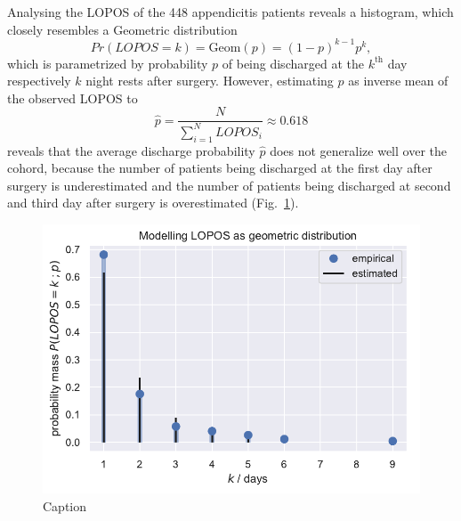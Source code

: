 Analysing the LOPOS of the 448 appendicitis patients reveals a histogram, which closely resembles a Geometric distribution
\begin{equation}
Pr(LOPOS=k) = \text{Geom}(p) = (1-p)^{k-1}p^{k},
\end{equation}
which is parametrized by probability $p$ of being discharged at the $k^\text{th}$ day respectively $k$ night rests after surgery. 
However, estimating $p$ as inverse mean of the observed LOPOS to 
\begin{equation}
 \hat{p} = \frac{N}{\sum\limits_{i=1}^N LOPOS_i} \approx 0.618	
\end{equation}
reveals that the average discharge probability $\hat{p}$ does not generalize well over the cohord, because the number of patients being discharged at the first day after surgery is underestimated and the number of patients being discharged at second and third day after surgery is overestimated (Fig.~\ref{fig:Geom}).

\begin{figure}
    \centering
    \includegraphics{images/DS19eH1_G0__empirical_geometric.pdf}
    \caption{Caption}
    \label{fig:Geom}
\end{figure}

